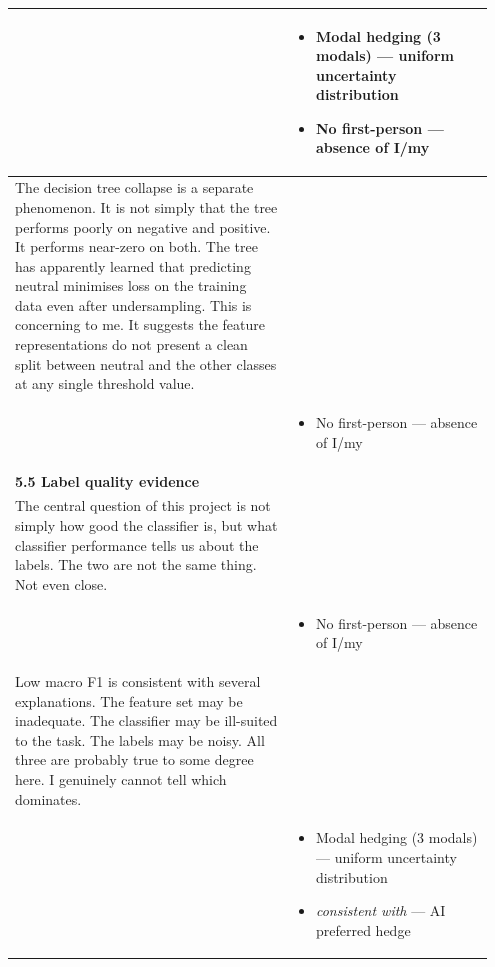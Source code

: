 \documentclass[11pt]{article}
\begin{document}
\begin{longtable}{|p{0.55\linewidth}|p{0.40\linewidth}|}
\hline
\rule[-3.5cm]{0pt}{3.5cm} & \begin{itemize}[leftmargin=1em,itemsep=1pt,topsep=1pt,parsep=0pt]
  \item Modal hedging (3 modals) --- uniform uncertainty distribution
  \item No first-person --- absence of I/my
\end{itemize} \\
\hline
The decision tree collapse is a separate phenomenon. It is not simply that the tree performs poorly on negative and positive. It performs near-zero on both. The tree has apparently learned that predicting neutral minimises loss on the training data even after undersampling. This is concerning to me. It suggests the feature representations do not present a clean split between neutral and the other classes at any single threshold value. & \\[2pt]
\hline
\rule[-3.5cm]{0pt}{3.5cm} & \begin{itemize}[leftmargin=1em,itemsep=1pt,topsep=1pt,parsep=0pt]
  \item No first-person --- absence of I/my
\end{itemize} \\
\hline
\textbf{5.5 Label quality evidence}\\[4pt]
The central question of this project is not simply how good the classifier is, but what classifier performance tells us about the labels. The two are not the same thing. Not even close. & \\[2pt]
\hline
\rule[-3.5cm]{0pt}{3.5cm} & \begin{itemize}[leftmargin=1em,itemsep=1pt,topsep=1pt,parsep=0pt]
  \item No first-person --- absence of I/my
\end{itemize} \\
\hline
Low macro F1 is consistent with several explanations. The feature set may be inadequate. The classifier may be ill-suited to the task. The labels may be noisy. All three are probably true to some degree here. I genuinely cannot tell which dominates. & \\[2pt]
\hline
\rule[-3.5cm]{0pt}{3.5cm} & \begin{itemize}[leftmargin=1em,itemsep=1pt,topsep=1pt,parsep=0pt]
  \item Modal hedging (3 modals) --- uniform uncertainty distribution
  \item \textit{consistent with} --- AI preferred hedge
\end{itemize} \\

\end{longtable}
\end{document}
